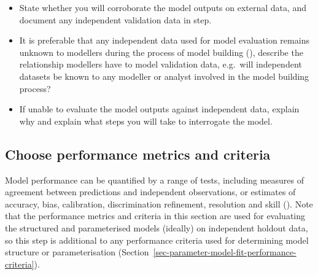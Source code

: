 \documentclass[
]{article}
\providecommand{\tightlist}{%
  \setlength{\itemsep}{0pt}\setlength{\parskip}{0pt}}
\begin{document}
\begin{tcolorbox}[enhanced jigsaw, opacitybacktitle=0.6, bottomrule=.15mm, leftrule=.75mm, rightrule=.15mm, colbacktitle=quarto-callout-caution-color!10!white, toprule=.15mm, titlerule=0mm, left=2mm, colframe=quarto-callout-caution-color-frame, breakable, title=\textcolor{quarto-callout-caution-color}{\faFire}\hspace{0.5em}{Preregistration Item}, opacityback=0, coltitle=black, bottomtitle=1mm, colback=white, toptitle=1mm, arc=.35mm]

\begin{itemize}
\tightlist
\item[$\square$]
  State whether you will corroborate the model outputs on external data,
  and document any independent validation data in step.
\item[$\square$]
  It is preferable that any independent data used for model evaluation
  remains unknown to modellers during the process of model building
  (), describe the
  relationship modellers have to model validation data, e.g.~will
  independent datasets be known to any modeller or analyst involved in
  the model building process?
\item[$\square$]
  If unable to evaluate the model outputs against independent data,
  explain why and explain what steps you will take to interrogate the
  model.
\end{itemize}

\end{tcolorbox}

\subsection{Choose performance metrics and
criteria}\label{choose-performance-metrics-and-criteria}

\begin{tcolorbox}[enhanced jigsaw, opacitybacktitle=0.6, bottomrule=.15mm, leftrule=.75mm, rightrule=.15mm, colbacktitle=quarto-callout-note-color!10!white, toprule=.15mm, titlerule=0mm, left=2mm, colframe=quarto-callout-note-color-frame, breakable, title=\textcolor{quarto-callout-note-color}{\faInfo}\hspace{0.5em}{Explanation}, opacityback=0, coltitle=black, bottomtitle=1mm, colback=white, toptitle=1mm, arc=.35mm]

Model performance can be quantified by a range of tests, including
measures of agreement between predictions and independent observations,
or estimates of accuracy, bias, calibration, discrimination refinement,
resolution and skill ().
Note that the performance metrics and criteria in this section are used
for evaluating the structured and parameterised models (ideally) on
independent holdout data, so this step is additional to any performance
criteria used for determining model structure or parameterisation
(Section~\ref{sec-parameter-model-fit-performance-criteria}).

\end{tcolorbox}
\end{document}
